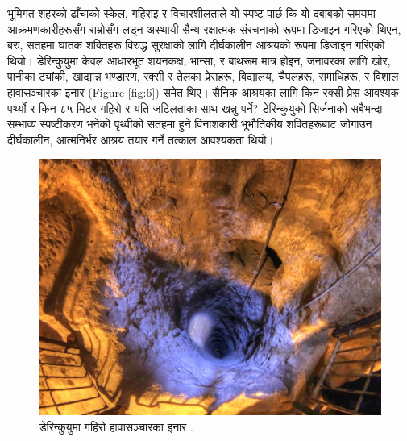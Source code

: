 \documentclass[10pt,twocolumn,letterpaper]{article}
\begin{document}
भूमिगत शहरको ढाँचाको स्केल, गहिराइ र विचारशीलताले यो स्पष्ट पार्छ कि यो दबाबको समयमा आक्रमणकारीहरूसँग राम्रोसँग लड्न अस्थायी सैन्य रक्षात्मक संरचनाको रूपमा डिजाइन गरिएको थिएन, बरु, सतहमा घातक शक्तिहरू विरुद्ध सुरक्षाको लागि दीर्घकालीन आश्रयको रूपमा डिजाइन गरिएको थियो। डेरिन्कुयुमा केवल आधारभूत शयनकक्ष, भान्सा, र बाथरूम मात्र होइन, जनावरका लागि खोर, पानीका ट्यांकी, खाद्यान्न भण्डारण, रक्सी र तेलका प्रेसहरू, विद्यालय, चैपलहरू, समाधिहरू, र विशाल हावासञ्चारका इनार (Figure \ref{fig:6}) समेत थिए। सैनिक आश्रयका लागि किन रक्सी प्रेस आवश्यक पर्थ्यो र किन ८५ मिटर गहिरो र यति जटिलताका साथ खन्नु पर्ने?
डेरिन्कुयुको सिर्जनाको सबैभन्दा सम्भाव्य स्पष्टीकरण भनेको पृथ्वीको सतहमा हुने विनाशकारी भूभौतिकीय शक्तिहरूबाट जोगाउन दीर्घकालीन, आत्मनिर्भर आश्रय तयार गर्ने तत्काल आवश्यकता थियो।

\begin{figure}[t]
\begin{center}
   \includegraphics[width=1\linewidth]{derinkuyu-air.jpg}
\end{center}
   \caption{डेरिन्कुयुमा गहिरो हावासञ्चारका इनार \cite{53}.}
\label{fig:6}

\label{fig:onecol}
\end{figure}


\end{document}

